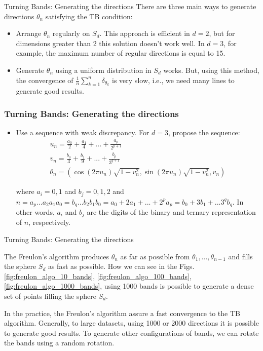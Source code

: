\begin{frame}{Turning Bands: Generating the directions}
There are three main ways to generate directions $\theta_n$ satisfying the TB condition:
\begin{itemize}
 \item Arrange $\theta_n$ regularly on $S_d$. This approach is efficient in $d=2$, but for dimensions greater than 2
 this solution doesn't work well. In $d=3$, for example, the maximum number of regular directions is equal to 15.
 \item Generate $\theta_n$ using a uniform distribution in $S_d$ works. 
 But, using this method, the convergence of $\frac{1}{n}\sum_{k=1}^{n}\delta_{\theta_k}$
 is very slow, i.e., we need many lines to generate good results.
 \end{itemize}

\end{frame}


\begin{frame}
\frametitle{Turning Bands: Generating the directions}
\begin{itemize}
 \item Use a sequence with weak discrepancy. For $d=3$, \cite{freulon1994conditional} propose the sequence:
 \begin{equation}
 \begin{aligned}
  u_n = \frac{a_0}{2} + \frac{a_1}{4} + ... + \frac{a_p}{2^{p+1}} \\
  v_n = \frac{b_0}{3} + \frac{b_1}{9} + ... + \frac{b_p}{3^{q+1}} \\
  \theta_n = \left( \cos(2\pi u_n) \sqrt{1-v_n^2}, \sin(2\pi u_n) \sqrt{1 - v_n^2}, v_n \right)
  \end{aligned}
 \end{equation}
 
 where $a_i = 0, 1$ and $b_j = 0, 1, 2$ and $n=a_p...a_2a_1a_0=b_q...b_2b_1b_0=a_0 + 2a_1 + ... + 2^pa_p=b_0+3b_1+...3^qb_q$. In other
 words, $a_i$ and $b_j$ are the digits of the binary and ternary representation of $n$, respectively.
\end{itemize}
\end{frame}

\begin{frame}{Turning Bands: Generating the directions}

The Freulon's algorithm produces $\theta_n$ as far as possible from $\theta_1, ... , \theta_{n-1}$ and fills the sphere $S_d$ as
fast as possible. How we can see in the Figs. \ref{fig:freulon_algo_10_bands}, \ref{fig:freulon_algo_100_bands}, 
\ref{fig:freulon_algo_1000_bands}, using 1000 bands is possible to generate a dense set of points filling the sphere $S_d$.

In the practice, the Freulon's algorithm assure a fast convergence to the TB algorithm. Generally, to large datasets, using 1000 or 2000 directions
it is possible to generate good results. To generate other configurations of bands, we can rotate the bands using a random rotation.
\end{frame}


